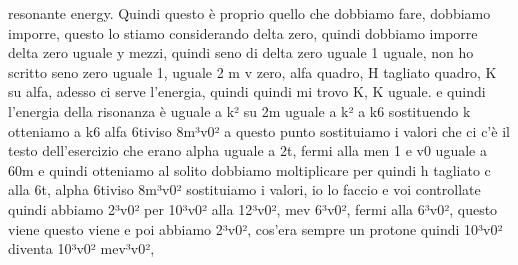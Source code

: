 \begin{soluzione}
{resonante energy. Quindi questo è proprio quello che dobbiamo fare, dobbiamo imporre, questo lo stiamo considerando delta zero, quindi dobbiamo imporre delta zero uguale y mezzi, quindi seno di delta zero uguale 1 uguale, non ho scritto seno zero uguale 1, uguale 2 m v zero, alfa quadro, H tagliato quadro, K su alfa, adesso ci serve l'energia, quindi quindi mi trovo K, K uguale. e quindi l'energia della risonanza è uguale a k² su 2m uguale a k² a k6 sostituendo k otteniamo a k6 alfa 6tiviso 8m³v0² a questo punto sostituiamo i valori che ci c'è il testo dell'esercizio che erano alpha uguale a 2t, fermi alla men 1 e v0 uguale a 60m e quindi otteniamo al solito dobbiamo moltiplicare per quindi h tagliato c alla 6t, alpha 6tiviso 8m³v0² sostituiamo i valori, io lo faccio e voi controllate quindi abbiamo 2³v0² per 10³v0² alla 12³v0², mev 6³v0², fermi alla 6³v0², questo viene questo viene e poi abbiamo 2³v0², cos'era sempre un protone quindi 10³v0² diventa 10³v0² mev³v0², 
   
}
\end{soluzione}
